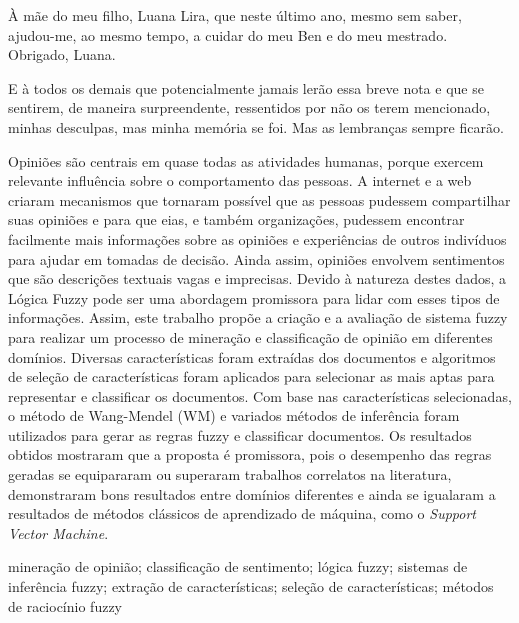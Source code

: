 \documentclass[msc, a4paper, classic, pt]{ufbathesis}
\begin{document}
À mãe do meu filho, Luana Lira, que neste último ano, mesmo sem saber, ajudou-me, ao mesmo tempo, a cuidar do meu Ben e do meu mestrado. Obrigado, Luana.

E à todos os demais que potencialmente jamais lerão essa breve nota e que se sentirem, de maneira surpreendente, ressentidos por não os terem mencionado, minhas desculpas, mas minha memória se foi. Mas as lembranças sempre ficarão.

\resumo
Opiniões são centrais em quase todas as atividades humanas, porque exercem relevante influência sobre o comportamento das pessoas. A internet e a web criaram mecanismos que tornaram possível que as pessoas pudessem compartilhar suas opiniões e para que eias, e também organizações, pudessem encontrar facilmente mais informações sobre as opiniões e experiências de outros indivíduos para ajudar em tomadas de decisão. Ainda assim, opiniões envolvem sentimentos que são descrições textuais vagas e imprecisas. Devido à natureza destes dados, a Lógica Fuzzy pode ser uma abordagem promissora para lidar com esses tipos de informações. Assim, este trabalho propõe a criação e a avaliação de sistema fuzzy para realizar um processo de mineração e classificação de opinião em diferentes domínios. Diversas características foram extraídas dos documentos e algoritmos de seleção de características foram aplicados para selecionar as mais aptas para representar e classificar os documentos. Com base nas características selecionadas, o método de Wang-Mendel (WM) e variados métodos de inferência foram utilizados para gerar as regras fuzzy e classificar documentos. Os resultados obtidos mostraram que a proposta é promissora, pois o desempenho das regras geradas se equipararam ou superaram trabalhos correlatos na literatura, demonstraram bons resultados entre domínios diferentes e ainda se igualaram a resultados de métodos clássicos de aprendizado de máquina, como o \textit{Support Vector Machine}.
\begin{keywords}
mineração de opinião; classificação de sentimento; lógica fuzzy; sistemas de inferência fuzzy; extração de características; seleção de características; métodos de raciocínio fuzzy
\end{keywords}
\end{document}
